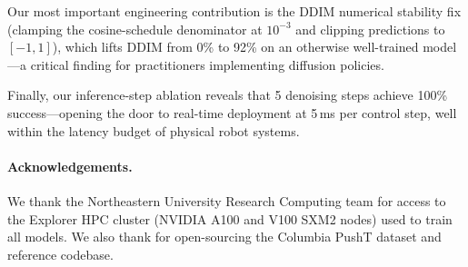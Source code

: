 \documentclass[10pt,letterpaper]{article}
\begin{document}
Our most important engineering contribution is the DDIM numerical stability fix
(clamping the cosine-schedule denominator at $10^{-3}$ and clipping predictions
to $[-1, 1]$), which lifts DDIM from 0\% to 92\% on an otherwise well-trained
model---a critical finding for practitioners implementing diffusion policies.

Finally, our inference-step ablation reveals that 5 denoising steps achieve 100\%
success---opening the door to real-time deployment at 5\,ms per control step,
well within the latency budget of physical robot systems.

\paragraph{Acknowledgements.}
We thank the Northeastern University Research Computing team for access to the
Explorer HPC cluster (NVIDIA A100 and V100 SXM2 nodes) used to train all models.
We also thank \citet{chi2023diffusion} for open-sourcing the Columbia PushT dataset
and reference codebase.



\end{document}
